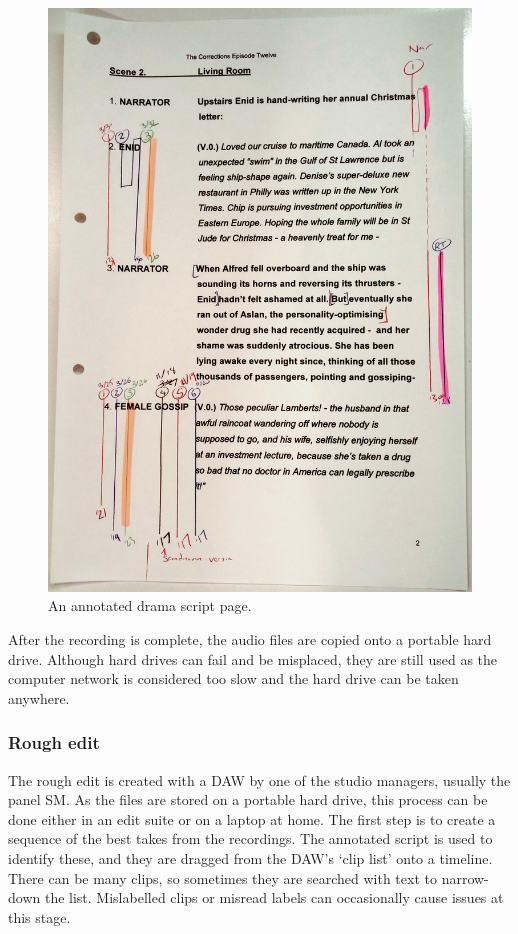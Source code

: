 \begin{figure}[ht]
  \centering
  \includegraphics[width=\columnwidth]{figs/drama-script-example-processed.jpg}
  \caption{An annotated drama script page.}
  \label{fig:drama-script}
\end{figure}

After the recording is complete, the audio files are copied onto a portable
hard drive. Although hard drives can fail and be misplaced, they are still used
as the computer network is considered too slow and the hard drive can be taken
anywhere.

\subsubsection{Rough edit}
The rough edit is created with a DAW by one of the studio managers, usually the
panel SM. As the files are stored on a portable hard drive, this process can be
done either in an edit suite or on a laptop at home. The first step is to
create a sequence of the best takes from the recordings. The annotated script
is used to identify these, and they are dragged from the DAW's `clip list' onto
a timeline. There can be many clips, so sometimes they are searched with text
to narrow-down the list. Mislabelled clips or misread labels can occasionally
cause issues at this stage.

